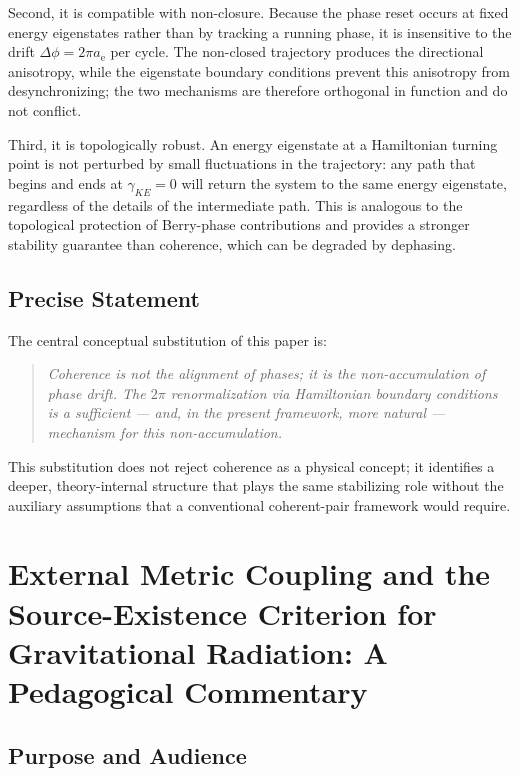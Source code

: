 \documentclass[%
 reprint, amsmath,amssymb, aps, prd, ]{revtex4-2}
\numberwithin{equation}{section}
\newcommand{\anom}{a_{\mathrm{e}}}
\begin{document}
Second, it is compatible with non-closure. Because the phase reset occurs at fixed energy eigenstates rather than by tracking a running phase, it is insensitive to the drift $\Delta\phi = 2\pi\anom$ per cycle. The non-closed trajectory produces the directional anisotropy, while the eigenstate boundary conditions prevent this anisotropy from desynchronizing; the two mechanisms are therefore orthogonal in function and do not conflict.

Third, it is topologically robust. An energy eigenstate at a Hamiltonian turning point is not perturbed by small fluctuations in the trajectory: any path that begins and ends at $\gamma_{KE} = 0$ will return the system to the same energy eigenstate, regardless of the details of the intermediate path. This is analogous to the topological protection of Berry-phase contributions and provides a stronger stability guarantee than coherence, which can be degraded by dephasing.

\subsection{Precise Statement}

The central conceptual substitution of this paper is:
\begin{quote}
\emph{Coherence is not the alignment of phases; it is the non-accumulation of phase drift. The $2\pi$ renormalization via Hamiltonian boundary conditions is a sufficient --- and, in the present framework, more natural --- mechanism for this non-accumulation.}
\end{quote}
This substitution does not reject coherence as a physical concept; it identifies a deeper, theory-internal structure that plays the same stabilizing role without the auxiliary assumptions that a conventional coherent-pair framework would require.

\section{External Metric Coupling and the Source-Existence Criterion for Gravitational Radiation: A Pedagogical Commentary}
\label{app:external_coupling}

\subsection{Purpose and Audience}
\end{document}
